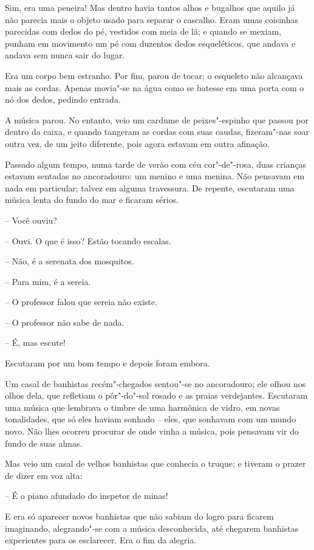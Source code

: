 Sim, era uma peneira! Mas dentro havia tantos alhos e bugalhos que
aquilo já não parecia mais o objeto usado para separar o cascalho. Eram
umas coisinhas parecidas com dedos do pé, vestidos com meia de lã; e
quando se mexiam, punham em movimento um pé com duzentos dedos
esqueléticos, que andava e andava sem nunca sair do lugar.

Era um corpo bem estranho. Por fim, parou de tocar; o esqueleto não
alcançava mais as cordas. Apenas movia"-se na água como se batesse em
uma porta com o nó dos dedos, pedindo entrada.

A música parou. No entanto, veio um cardume de peixes"-espinho que
passou por dentro da caixa, e quando tangeram as cordas com suas
caudas, fizeram"-nas soar outra vez, de um jeito diferente, pois agora
estavam em outra afinação.
\asterisc

Passado algum tempo, numa tarde de verão com céu cor"-de"-rosa, duas
crianças estavam sentadas no ancoradouro: um menino e uma menina. Não
pensavam em nada em particular; talvez em alguma travessura. De
repente, escutaram uma música lenta do fundo do mar e ficaram sérios.

-- Você ouviu?

-- Ouvi. O que é isso? Estão tocando escalas.

-- Não, é a serenata dos mosquitos.

-- Para mim, é a sereia.

-- O professor falou que sereia não existe.

-- O professor não sabe de nada.

-- É, mas escute!

Escutaram por um bom tempo e depois foram embora.

Um casal de banhistas recém"-chegados sentou"-se no ancoradouro; ele
olhou nos olhos dela, que refletiam o pôr"-do"-sol rosado e as praias
verdejantes. Escutaram uma música que lembrava o timbre de uma
harmônica de vidro, em novas tonalidades, que só eles haviam sonhado --
eles, que sonhavam com um mundo novo. Não lhes ocorreu procurar de onde
vinha a música, pois pensavam vir do fundo de suas almas.

Mas veio um casal de velhos banhistas que conhecia o truque; e tiveram o
prazer de dizer em voz alta:

-- É o piano afundado do inspetor de minas!

E era só aparecer novos banhistas que não sabiam do logro para ficarem
imaginando, alegrando"-se com a música desconhecida, até chegarem
banhistas experientes para os esclarecer. Era o fim da alegria.

